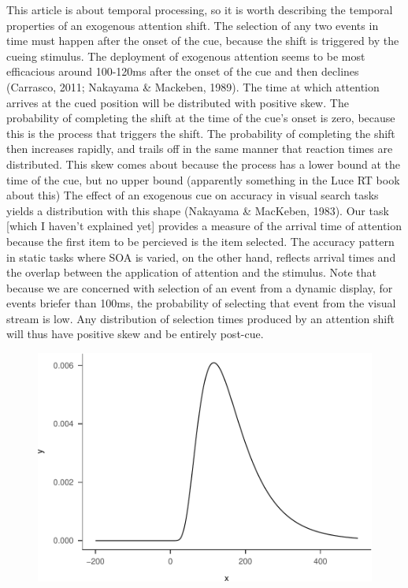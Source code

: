 \documentclass[,man]{apa6}
\theoremstyle{definition}
\theoremstyle{definition}
\theoremstyle{definition}
\theoremstyle{remark}
\begin{document}
This article is about temporal processing, so it is worth describing the
temporal properties of an exogenous attention shift. The selection of
any two events in time must happen after the onset of the cue, because
the shift is triggered by the cueing stimulus. The deployment of
exogenous attention seems to be most efficacious around 100-120ms after
the onset of the cue and then declines (Carrasco, 2011; Nakayama \&
Mackeben, 1989). The time at which attention arrives at the cued
position will be distributed with positive skew. The probability of
completing the shift at the time of the cue's onset is zero, because
this is the process that triggers the shift. The probability of
completing the shift then increases rapidly, and trails off in the same
manner that reaction times are distributed. This skew comes about
because the process has a lower bound at the time of the cue, but no
upper bound (apparently something in the Luce RT book about this) The
effect of an exogenous cue on accuracy in visual search tasks yields a
distribution with this shape (Nakayama \& MacKeben, 1983). Our task
{[}which I haven't explained yet{]} provides a measure of the arrival
time of attention because the first item to be percieved is the item
selected. The accuracy pattern in static tasks where SOA is varied, on
the other hand, reflects arrival times and the overlap between the
application of attention and the stimulus. Note that because we are
concerned with selection of an event from a dynamic display, for events
briefer than 100ms, the probability of selecting that event from the
visual stream is low. Any distribution of selection times produced by an
attention shift will thus have positive skew and be entirely post-cue.

\begin{figure}
\centering
\includegraphics{nStreams_Bayesian_files/figure-latex/unnamed-chunk-2-1.pdf}
\caption{}
\end{figure}
\end{document}
